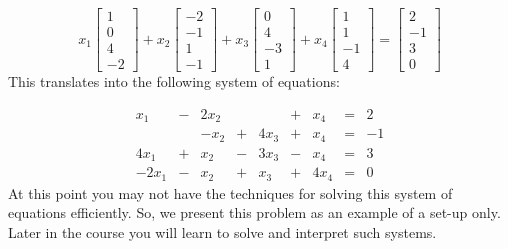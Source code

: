 \documentclass{ximera}
\begin{document}
\begin{example}
\begin{explanation}
$$x_1\begin{bmatrix}1\\0\\4\\-2\end{bmatrix}+x_2\begin{bmatrix}-2\\-1\\1\\-1\end{bmatrix}+x_3\begin{bmatrix}0\\4\\-3\\1\end{bmatrix}+x_4\begin{bmatrix}1\\1\\-1\\4\end{bmatrix}=\begin{bmatrix}2\\-1\\3\\0\end{bmatrix}$$
This translates into the following system of equations:

$$\begin{array}{ccccccccc}
      x_1 & -&2x_2 & & &+ & x_4&= &2 \\
        & &-x_2  &+ &4x_3 & +& x_4&= &-1 \\
      4x_1 &+ &x_2 & -&3x_3 &-&x_4&= &3\\
	 -2x_1& -&x_2 & +&x_3&+&4x_4&=&0
    \end{array}$$
    At this point you may not have the techniques for solving this system of equations efficiently.  So, we present this problem as an example of a set-up only.  Later in the course you will learn to solve and interpret such systems.
\end{explanation}
\end{example}
\end{document}
